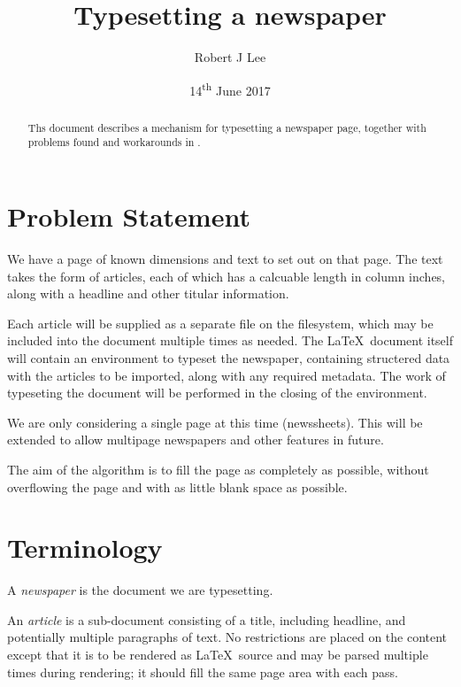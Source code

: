 \documentclass[a4paper]{scrartcl}
\begin{document}
\title{Typesetting a newspaper}
\author{Robert J Lee}
\date{14\textsuperscript{th} June 2017}

\maketitle

\begin{abstract} Ths document describes a mechanism for typesetting a
	newspaper page, together with problems found and workarounds in
	\LaTeXe.
\end{abstract}

\section{Problem Statement}

We have a page of known dimensions and text to set out on that page.
The text takes the form of articles, each of which has a calcuable
length in column inches, along with a headline and other titular
information.

Each article will be supplied as a separate file on the filesystem,
which may be included into the document multiple times as needed. The
\LaTeX\ document itself will contain an environment to typeset the
newspaper, containing structered data with the articles to be
imported, along with any required metadata. The work of typeseting the
document will be performed in the closing of the environment.

We are only considering a single page at this time (newssheets). This
will be extended to allow multipage newspapers and other features in future.

The aim of the algorithm is to fill the page as completely as
possible, without overflowing the page and with as little blank space
as possible.

\section{Terminology}

A \textit{newspaper} is the document we are typesetting.

An \textit{article} is a sub-document consisting of a title, including
headline, and potentially multiple paragraphs of text. No restrictions
are placed on the content except that it is to be rendered as
\LaTeX\ source and may be parsed multiple times during rendering; it
should fill the same page area with each pass.
\end{document}
